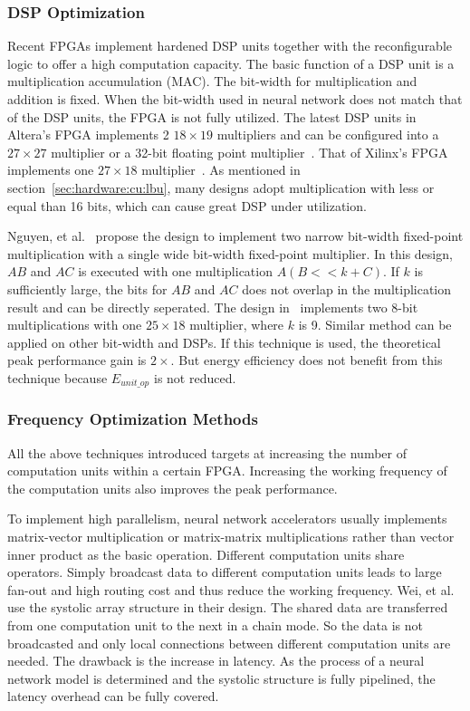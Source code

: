 \subsubsection{DSP Optimization}
Recent FPGAs implement hardened DSP units together with the reconfigurable logic to offer a high computation capacity. The basic function of a DSP unit is a multiplication accumulation (MAC). The bit-width for multiplication and addition is fixed. When the bit-width used in neural network does not match that of the DSP units, the FPGA is not fully utilized. The latest DSP units in Altera's FPGA implements 2 $18\times 19$ multipliers and can be configured into a $27\times 27$ multiplier or a 32-bit floating point multiplier~\cite{altera_dsp}. That of Xilinx's FPGA implements one $27\times 18$ multiplier~\cite{xilinx_dsp}. As mentioned in section~\ref{sec:hardware:cu:lbu}, many designs adopt multiplication with less or equal than 16 bits, which can cause great DSP under utilization.

Nguyen, et al.~\cite{nguyen2017double} propose the design to implement two narrow bit-width fixed-point multiplication with a single wide bit-width fixed-point multiplier. In this design, $AB$ and $AC$ is executed with one multiplication $A(B<<k+C)$. If $k$ is sufficiently large, the bits for $AB$ and $AC$ does not overlap in the multiplication result and can be directly seperated. The design in~\cite{nguyen2017double} implements two 8-bit multiplications with one $25\times 18$ multiplier, where $k$ is 9. Similar method can be applied on other bit-width and DSPs. If this technique is used, the theoretical peak performance gain is $2\times$. But energy efficiency does not benefit from this technique because $E_{unit\_op}$ is not reduced.

\subsubsection{Frequency Optimization Methods}
All the above techniques introduced targets at increasing the number of computation units within a certain FPGA. Increasing the working frequency of the computation units also improves the peak performance.

To implement high parallelism, neural network accelerators usually implements matrix-vector multiplication or matrix-matrix multiplications rather than vector inner product as the basic operation. Different computation units share operators. Simply broadcast data to different computation units leads to large fan-out and high routing cost and thus reduce the working frequency. Wei, et al.~\cite{wei2017automated} use the systolic array structure in their design. The shared data are transferred from one computation unit to the next in a chain mode. So the data is not broadcasted and only local connections between different computation units are needed. The drawback is the increase in latency. As the process of a neural network model is determined and the systolic structure is fully pipelined, the latency overhead can be fully covered.

